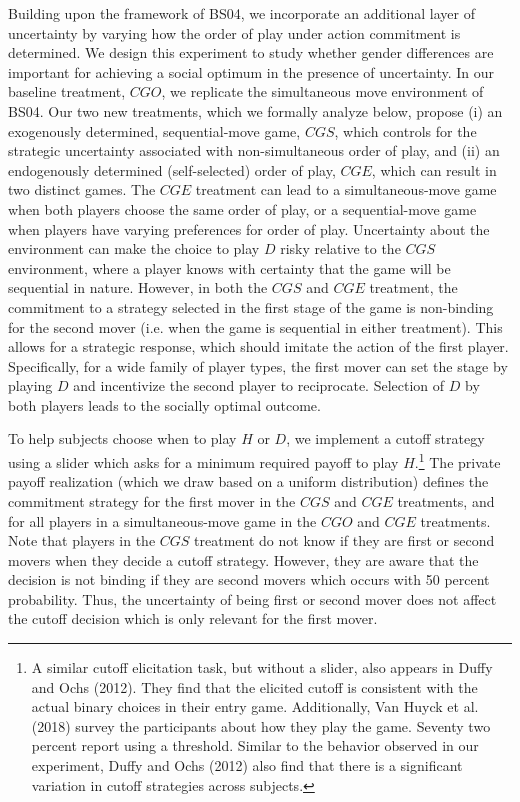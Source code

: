 \documentclass[12pt,english]{article}
\begin{document}
Building upon the framework of BS04, we incorporate an additional layer of uncertainty by varying how the order of play under action commitment is determined. We design this experiment to study whether gender differences are important for achieving a social optimum in the presence of uncertainty. In our baseline treatment, $CGO$, we replicate the simultaneous move environment of BS04. Our two new treatments, which we formally analyze below, propose (i) an exogenously determined, sequential-move game, $CGS$, which controls for the strategic uncertainty associated with non-simultaneous order of play, and (ii) an endogenously determined (self-selected) order of play, $CGE$, which can result in two distinct games. The $CGE$ treatment can lead to a simultaneous-move game when both players choose the same order of play, or a sequential-move game when players have varying preferences for order of play. Uncertainty about the environment can make the choice to play $D$ risky relative to the $CGS$ environment, where a player knows with certainty that the game will be sequential in nature. However, in both the $CGS$ and $CGE$ treatment, the commitment to a strategy selected in the first stage of the game is non-binding for the second mover (i.e. when the game is sequential in either treatment). This allows for a strategic response, which should imitate the action of the first player. Specifically, for a wide family of player types, the first mover can set the stage by playing $D$ and incentivize the second player to reciprocate. Selection of $D$ by both players leads to the socially optimal outcome.

To help subjects choose when to play $H$ or $D$, we implement a cutoff strategy using a slider which asks for a minimum required payoff to play $H$.\footnote{A similar cutoff elicitation task, but without a slider, also appears in Duffy and Ochs (2012). They find that the elicited cutoff is consistent with the actual binary choices in their entry game. Additionally, Van Huyck et al. (2018) survey the participants about how they play the game. Seventy two percent report using a threshold. Similar to the behavior observed in our experiment, Duffy and Ochs (2012) also find that there is a significant variation in cutoff strategies across subjects.} The private payoff realization (which we draw based on a uniform distribution) defines the commitment strategy for the first mover in the $CGS$ and $CGE$ treatments, and for all players in a simultaneous-move game in the $CGO$ and $CGE$ treatments. Note that players in the $CGS$ treatment do not know if they are first or second movers when they decide a cutoff strategy. However, they are aware that the decision is not binding if they are second movers which occurs with 50 percent probability. Thus, the uncertainty of being first or second mover does not affect the cutoff decision which is only relevant for the first mover.
\end{document}
